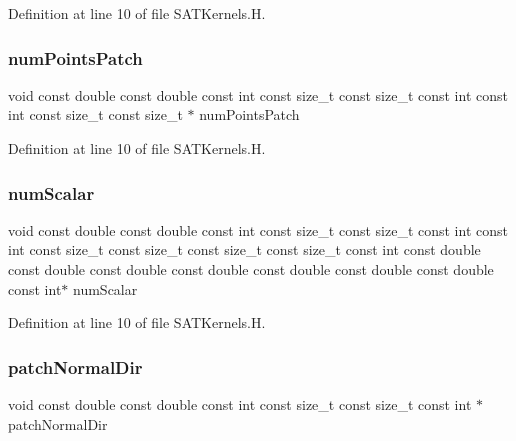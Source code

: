 Definition at line 10 of file S\+A\+T\+Kernels.\+H.

\hypertarget{SATKernels_8H_a5daa362dd0f031e81325fa4199fae8c1}{}\label{SATKernels_8H_a5daa362dd0f031e81325fa4199fae8c1} 
\subsubsection{\texorpdfstring{num\+Points\+Patch}{numPointsPatch}}
{\footnotesize\ttfamily void const double const double const int const size\+\_\+t const size\+\_\+t const int const int const size\+\_\+t const size\+\_\+t $\ast$ num\+Points\+Patch}



Definition at line 10 of file S\+A\+T\+Kernels.\+H.

\hypertarget{SATKernels_8H_ac97409f480a745850ce5b215aabef12a}{}\label{SATKernels_8H_ac97409f480a745850ce5b215aabef12a} 
\subsubsection{\texorpdfstring{num\+Scalar}{numScalar}}
{\footnotesize\ttfamily void const double const double const int const size\+\_\+t const size\+\_\+t const int const int const size\+\_\+t const size\+\_\+t const size\+\_\+t const size\+\_\+t const int const double const double const double const double const double const double const double const int$\ast$ num\+Scalar}



Definition at line 10 of file S\+A\+T\+Kernels.\+H.

\hypertarget{SATKernels_8H_a64cccc8cf13f56aec2b85bc30d83e456}{}\label{SATKernels_8H_a64cccc8cf13f56aec2b85bc30d83e456} 
\subsubsection{\texorpdfstring{patch\+Normal\+Dir}{patchNormalDir}}
{\footnotesize\ttfamily void const double const double const int const size\+\_\+t const size\+\_\+t const int $\ast$ patch\+Normal\+Dir}



